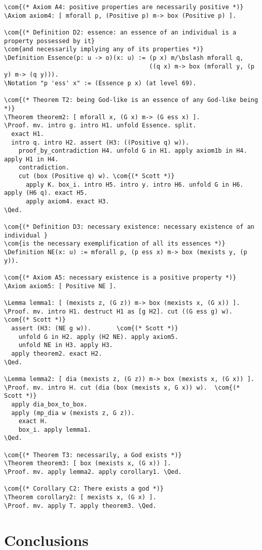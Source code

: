 \documentclass{llncs}
\newcommand{\red}[1]{\textcolor[rgb]{1,0,0}{#1}}
\newcommand{\blue}[1]{\textcolor[rgb]{0,0,1}{#1}}
\newcommand{\brown}[1]{\textcolor[rgb]{0.8,0.6,0.4}{#1}}
\newcommand{\Axiom}{\red{Axiom}}
\newcommand{\Lemma}{\red{Lemma}}
\newcommand{\Theorem}{\red{Theorem}}
\newcommand{\Definition}{\red{Definition}}
\newcommand{\Notation}{\blue{Notation}}
\newcommand{\Proof}{\blue{Proof}}
\newcommand{\Qed}{\blue{Qed}}
\newcommand{\com}[1]{\brown{#1}}
\newcommand{\bslash}{\symbol{92}}
\begin{document}
\begin{Verbatim}[commandchars=\\\{\},fontsize=\verbsize]
\com{(* Axiom A4: positive properties are necessarily positive *)}
\Axiom axiom4: [ mforall p, (Positive p) m-> box (Positive p) ].

\com{(* Definition D2: essence: an essence of an individual is a property possessed by it} 
\com{and necessarily implying any of its properties *)}
\Definition Essence(p: u -> o)(x: u) := (p x) m/\bslash mforall q, 
                                        ((q x) m-> box (mforall y, (p y) m-> (q y))).
\Notation "p 'ess' x" := (Essence p x) (at level 69).

\com{(* Theorem T2: being God-like is an essence of any God-like being *)}
\Theorem theorem2: [ mforall x, (G x) m-> (G ess x) ].
\Proof. mv. intro g. intro H1. unfold Essence. split.
  exact H1.
  intro q. intro H2. assert (H3: ((Positive q) w)).
    proof_by_contradiction H4. unfold G in H1. apply axiom1b in H4. apply H1 in H4. 
    contradiction. 
    cut (box (Positive q) w). \com{(* Scott *)}
      apply K. box_i. intro H5. intro y. intro H6. unfold G in H6. apply (H6 q). exact H5.
      apply axiom4. exact H3.
\Qed.

\com{(* Definition D3: necessary existence: necessary existence of an individual }
\com{is the necessary exemplification of all its essences *)}
\Definition NE(x: u) := mforall p, (p ess x) m-> box (mexists y, (p y)).

\com{(* Axiom A5: necessary existence is a positive property *)}
\Axiom axiom5: [ Positive NE ].

\Lemma lemma1: [ (mexists z, (G z)) m-> box (mexists x, (G x)) ].
\Proof. mv. intro H1. destruct H1 as [g H2]. cut ((G ess g) w). \com{(* Scott *)}
  assert (H3: (NE g w)).       \com{(* Scott *)}
    unfold G in H2. apply (H2 NE). apply axiom5.
    unfold NE in H3. apply H3.
  apply theorem2. exact H2.
\Qed.

\Lemma lemma2: [ dia (mexists z, (G z)) m-> box (mexists x, (G x)) ].
\Proof. mv. intro H. cut (dia (box (mexists x, G x)) w).  \com{(* Scott *)}
  apply dia_box_to_box.
  apply (mp_dia w (mexists z, G z)).
    exact H.
    box_i. apply lemma1.
\Qed.

\com{(* Theorem T3: necessarily, a God exists *)}
\Theorem theorem3: [ box (mexists x, (G x)) ].
\Proof. mv. apply lemma2. apply corollary1. \Qed.

\com{(* Corollary C2: There exists a god *)}
\Theorem corollary2: [ mexists x, (G x) ].
\Proof. mv. apply T. apply theorem3. \Qed.
\end{Verbatim}


\section{Conclusions}
\label{sec:conclusions}
\end{document}
